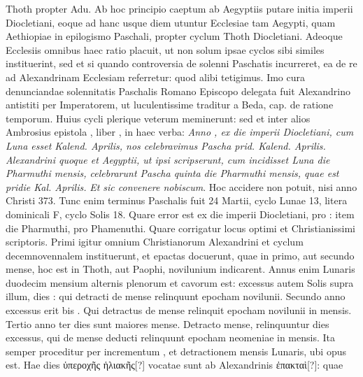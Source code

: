  Thoth
propter Adu.
Ab hoc principio caeptum ab Aegyptiis putare initia
imperii Diocletiani, eoque ad hanc usque diem utuntur Ecclesiae tam
Aegypti, quam Aethiopiae in epilogismo Paschali, propter cyclum
Thoth Diocletiani.
%
Adeoque Ecclesiis omnibus haec ratio placuit,
ut non solum ipsae cyclos sibi similes instituerint, sed et si quando
controversia de solenni Paschatis incurreret, ea de re ad Alexandrinam
Ecclesiam referretur: quod alibi tetigimus.
Imo cura denunciandae
solennitatis Paschalis Romano Episcopo delegata fuit
Alexandrino antistiti per Imperatorem, ut luculentissime traditur a
Beda,  cap. %
 de ratione temporum.
Huius cycli plerique veterum
meminerunt: sed et inter alios Ambrosius epistola ,
 liber , %
in haec verba: \textit{Anno , ex die imperii Diocletiani,
 cum 
Luna esset  Kalend. Aprilis, nos celebravimus Pascha prid. Kalend.
Aprilis.}
\textit{Alexandrini quoque et Aegyptii, ut ipsi scripserunt,
 cum incidisset
 Luna  die Pharmuthi mensis, celebrarunt Pascha
quinta die Pharmuthi mensis, quae est pridie Kal. Aprilis.}
\textit{Et sic convenere
nobiscum}.
Hoc accidere non potuit, nisi anno Christi 373.
Tunc enim terminus Paschalis fuit 24 Martii, cyclo Lunae 13, litera
dominicali F, cyclo Solis 18.
Quare error est  ex die imperii
Diocletiani, pro : item  die Pharmuthi,
 pro Phamenuthi.
Quare corrigatur locus optimi et Christianissimi scriptoris.
Primi igitur omnium Christianorum Alexandrini et cyclum decemnovennalem
instituerunt, et epactas docuerunt, quae in primo, aut secundo
mense, hoc est in Thoth, aut Paophi, novilunium indicarent.
Annus enim Lunaris duodecim mensium alternis plenorum et cavorum
est: excessus autem Solis supra illum, dies : qui detracti de
mense relinquunt  epocham novilunii.
Secundo anno excessus
erit bis .
Qui detractus de mense relinquit epocham novilunii in
 mensis.
Tertio anno ter  dies sunt maiores mense.
Detracto
mense, relinquuntur  dies excessus, qui de mense deducti relinquunt
epocham neomeniae in  mensis.
Ita semper proceditur
per incrementum , et detractionem mensis Lunaris, ubi opus est.
Hae dies \textgreek{ὑπεροχῆς ἡλιακῆς[?]} vocatae sunt ab Alexandrinis
 \textgreek{ἐπακταὶ[?]}: quae
